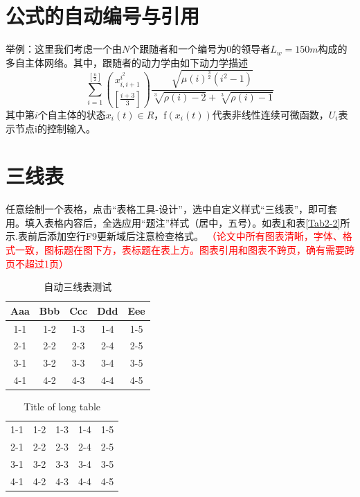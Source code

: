 \section{公式的自动编号与引用}
举例：这里我们考虑一个由$N$个跟随者和一个编号为0的领导者$L_w = 150 m$构成的多自主体网络。其中，跟随者的动力学由如下动力学描述
\begin{equation}
\sum_{i=1}^{\left[ \frac{n}{2}\right]} \binom{x_{i,i+1}^{i^2}}
{\left[\frac{i+3}{3} \right]} \frac{\sqrt{\mu(i)^{\frac{3}{2}}
(i^2-1)}} {\sqrt[3]{\rho(i)-2}+\sqrt[3]{\rho(i)-1}}
\end{equation}
其中第$i$个自主体的状态$x_i (t)\in R$，f$(x_i (t))$代表非线性连续可微函数，$U_i$表示节点i的控制输入。


\section{三线表}
任意绘制一个表格，点击“表格工具-设计”，选中自定义样式“三线表”，即可套用。填入表格内容后，全选应用“题注”样式（居中，五号）。如表\ref{Tab2-1}和表\ref{Tab2-2}所示.表前后添加空行F9更新域后注意检查格式。 
\textcolor{red}{（论文中所有图表清晰，字体、格式一致，图标题在图下方，表标题在表上方。图表引用和图表不跨页，确有需要跨页不超过1页）}

\begin{table}[htbp]
  \centering
  \caption{自动三线表测试}
    \begin{tabular}{ccccc}
    \toprule
    Aaa & Bbb & Ccc & Ddd & Eee \\
    \midrule
    1-1  & 1-2  & 1-3 & 1-4 & 1-5 \\
    2-1  & 2-2  & 2-3 & 2-4 & 2-5 \\
    3-1  & 3-2  & 3-3 & 3-4 & 3-5 \\
    4-1  & 4-2  & 4-3 & 4-4 & 4-5 \\
    \bottomrule
    \end{tabular}
  \label{Tab2-1}
\end{table}

\begin{longtable}{ccccc}
\caption{Title of long table}\\
    \hline
    1-1  & 1-2  & 1-3 & 1-4 & 1-5 \\
    2-1  & 2-2  & 2-3 & 2-4 & 2-5 \\
    3-1  & 3-2  & 3-3 & 3-4 & 3-5 \\
    4-1  & 4-2  & 4-3 & 4-4 & 4-5 \\
    \bottomrule
\end{longtable}

